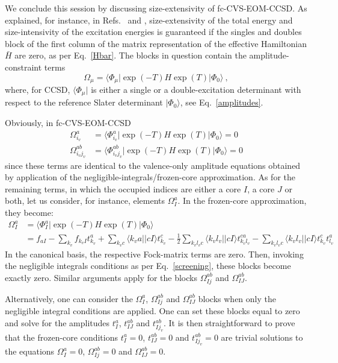 \documentclass[journal=jctcce,manuscript=article]{achemso}
\begin{document}
We conclude this session by discussing size-extensivity of fc-CVS-EOM-CCSD.    
As explained, for instance, in Refs.~ and , size-extensivity of the total energy and 
size-intensivity of the excitation energies is guaranteed if the singles and doubles block of the first column of the matrix representation
of the effective Hamiltonian $\bar{H}$ are zero, as per Eq.~\eqref{Hbar}.
The blocks in question contain the amplitude-constraint terms 
\begin{equation}
    \Omega_\mu = \langle \Phi_\mu | \exp(-T) H \exp(T) | \Phi_0 \rangle~,
\end{equation} 
where, for CCSD, $\langle \Phi_\mu |$ is
either a single or a double-excitation determinant with respect to the reference Slater determinant $|\Phi_0\rangle$, see Eq.~\eqref{amplitudes}.  

Obviously, in fc-CVS-EOM-CCSD
\begin{align}
\Omega_{i_v}^a &= \langle \Phi_{i_v}^{a} | \exp(-T) H \exp(T) | \Phi_0 \rangle=0 \\
\Omega_{i_v j_v }^{ab}&=\langle \Phi_{i_v j_v}^{ab}|\exp(-T)H\exp(T)|\Phi_0 \rangle=0
\end{align}
since these terms are identical to the valence-only amplitude equations obtained by application of the negligible-integrals/frozen-core approximation.
As for the remaining terms, in which the occupied indices are either a core $I$, a core $J$ or  both, 
let us consider, for instance, elements $\Omega_I^a$.
In the frozen-core approximation, they become:
\begin{equation}
\begin{aligned}
\Omega_I^a & = \langle \Phi_{I}^{a} | \exp(-T) H \exp(T) | \Phi_0 \rangle \\
& = 
f_{aI} 
- \sum_{k_v} f_{k_v I} t^a_{k_v}
+ \sum_{k_vc} \langle k_v a || cI \rangle t_{k_v}^c  
- \frac{1}{2} \sum_{k_vl_vc} \langle k_v l_v || cI \rangle t_{k_vl_v}^{ca}
- \sum_{k_v l_v c} \langle k_v l_v || cI \rangle t_{k_v}^{c} t_{l_v}^a
\end{aligned}
\end{equation}
In the canonical basis, the respective Fock-matrix terms are zero.
Then, invoking the negligible integrals conditions as per Eq.~\eqref{screening}, 
these blocks become exactly zero. Similar arguments apply for the blocks $\Omega_{Ij}^{ab}$ and $\Omega_{IJ}^{ab}$. 

Alternatively, one can consider the $\Omega_I^a$, $\Omega_{Ij}^{ab}$ and $\Omega_{IJ}^{ab}$ blocks when only the negligible integral conditions are applied. One can set these blocks equal to zero and solve
for the amplitudes $t^a_I$, $t^{ab}_{IJ}$ and $t^{ab}_{Ij_v}$. 
It is then straightforward to prove that the frozen-core conditions 
$t^a_I=0$, $t^{ab}_{IJ}=0$ and $t^{ab}_{Ij_v}=0$ are trivial solutions to the equations $\Omega_I^a=0$, $\Omega_{Ij}^{ab}=0$ and $\Omega_{IJ}^{ab}=0$.
\end{document}
